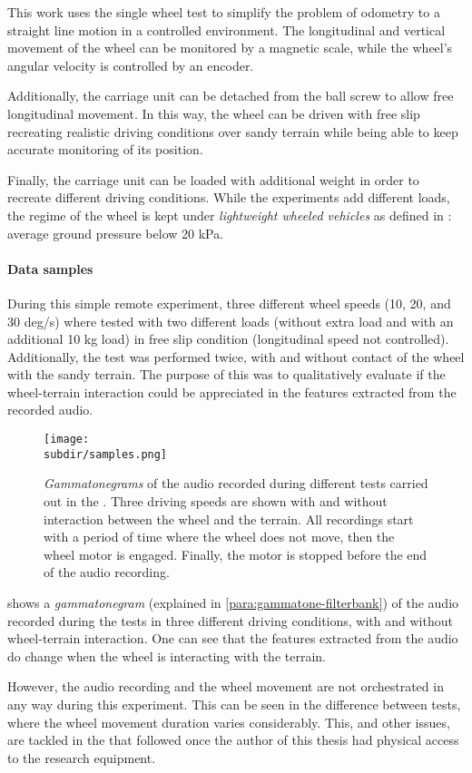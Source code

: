 This work uses the single wheel test to simplify the problem of odometry to a
straight line motion in a controlled environment. The longitudinal and vertical
movement of the wheel can be monitored by a magnetic scale, while the wheel's
angular velocity is controlled by an encoder.

Additionally, the carriage unit can be detached from the ball screw to allow
free longitudinal movement. In this way, the wheel can be driven with free slip
recreating realistic driving conditions over sandy terrain while being able to
keep accurate monitoring of its position.

Finally, the carriage unit can be loaded with additional weight in order to
recreate different driving conditions. While the experiments add different
loads, the regime of the wheel is kept under \emph{lightweight wheeled
vehicles} as defined in \cite{SENATORE2014}: average ground pressure below
20 kPa.

\paragraph{Data samples}
\label{para:wtb-0-data-samples}

During this simple remote experiment, three different wheel speeds (10, 20, and
30 deg/s) where tested with two different loads (without extra load and with an
additional 10 kg load) in free slip condition (longitudinal speed not
controlled). Additionally, the test was performed twice, with and without
contact of the wheel with the sandy terrain. The purpose of this was to
qualitatively evaluate if the wheel-terrain interaction could be appreciated in
the features extracted from the recorded audio.

\begin{figure}
    \centering
    \texttt{[image: \\subdir/samples.png]}
    \caption[Gammatonegrams from
        ]{\emph{Gammatonegrams} of
        the audio recorded during different tests carried out in the
        . Three driving speeds are
        shown with and without interaction between the wheel and the terrain.
        All recordings start with a period of time where the wheel does not
        move, then the wheel motor is engaged. Finally, the motor is stopped
        before the end of the audio recording.}
    \label{fig:wtb-0-data-samples}
\end{figure}


 shows a \emph{gammatonegram} (explained in
\cref{para:gammatone-filterbank}) of the audio recorded during the tests
in three different driving conditions, with and without wheel-terrain
interaction. One can see that the features extracted from the audio do change
when the wheel is interacting with the terrain.

However, the audio recording and the wheel movement are not orchestrated in any
way during this experiment. This can be seen in the difference between tests,
where the wheel movement duration varies considerably. This, and other issues,
are tackled in the  that followed
once the author of this thesis had physical access to the research equipment.
